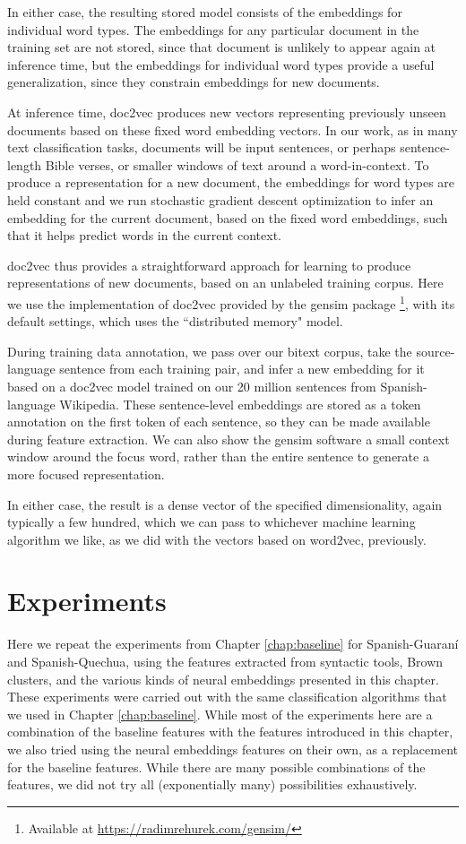 In either case, the resulting stored model consists of the embeddings for
individual word types. The embeddings for any particular document in the
training set are not stored, since that document is unlikely to appear again at
inference time, but the embeddings for individual word types provide a useful
generalization, since they constrain embeddings for new documents.

At inference time, doc2vec produces new vectors representing previously unseen
documents based on these fixed word embedding vectors. In our work, as in many
text classification tasks, documents will be input sentences, or perhaps
sentence-length Bible verses, or smaller windows of text around a
word-in-context. To produce a representation for a new document, the embeddings
for word types are held constant and we run stochastic gradient descent
optimization to infer an embedding for the current document, based on the fixed
word embeddings, such that it helps predict words in the current context.

doc2vec thus provides a straightforward approach for learning to produce
representations of new documents, based on an unlabeled training corpus. Here
we use the implementation of doc2vec provided by the gensim package
\cite{rehurek-lrec} \footnote{Available at
\url{https://radimrehurek.com/gensim/}}, with its default settings, which uses
the ``distributed memory" model.

During training data annotation, we pass over our bitext corpus, take the
source-language sentence from each training pair, and infer a new embedding for
it based on a doc2vec model trained on our 20 million sentences from
Spanish-language Wikipedia. These sentence-level embeddings are stored as a
token annotation on the first token of each sentence, so they can be made
available during feature extraction. We can also show the gensim software a
small context window around the focus word, rather than the entire sentence to
generate a more focused representation.

In either case, the result is a dense vector of the specified dimensionality,
again typically a few hundred, which we can pass to whichever machine learning
algorithm we like, as we did with the vectors based on word2vec, previously.

\section{Experiments}
\label{sec:monolingual-experiments}
Here we repeat the experiments from Chapter \ref{chap:baseline} for
Spanish-Guaraní and Spanish-Quechua, using the features extracted from
syntactic tools, Brown clusters, and the various kinds of neural embeddings
presented in this chapter.
These experiments were carried out with the same classification algorithms that
we used in Chapter \ref{chap:baseline}. While most of the experiments here are
a combination of the baseline features with the features introduced in this
chapter, we also tried using the neural embeddings features on their own,
as a replacement for the baseline features. While there are many possible
combinations of the features, we did not try all (exponentially many)
possibilities exhaustively.

